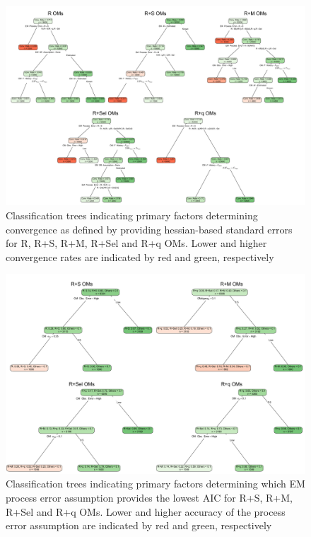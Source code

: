 \documentclass[
  12pt,
]{article}
\begin{document}
\begin{landscape}
\begin{figure}
\begin{center}
\includegraphics{convergence_classification_plots}
\end{center}
\caption{Classification trees indicating primary factors determining convergence as defined by providing hessian-based standard errors for R, R+S, R+M, R+Sel and R+q OMs. Lower and higher convergence rates are indicated by red and green, respectively}\label{conv_class}
\end{figure}
\end{landscape}

\begin{landscape}
\begin{figure}
\begin{center}
\includegraphics{AIC_PE_classification_plots}
\end{center}
\caption{Classification trees indicating primary factors determining which EM process error assumption provides the lowest AIC for R+S, R+M, R+Sel and R+q OMs. Lower and higher accuracy of the process error assumption are indicated by red and green, respectively}\label{AIC_PE_class}
\end{figure}
\end{landscape}
\end{document}
